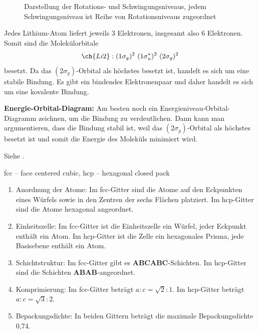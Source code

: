 \begin{figure}[H]
\begin{minipage}[b]{.4\linewidth}
      \caption{Darstellung der Rotations- und Schwingungsniveaus, jedem Schwingungsniveau ist Reihe von Rotationsniveaus zugeordnet}
   \end{minipage}
    \end{figure}


\label{q:44}

Jedes Lithium-Atom liefert jeweils 3 Elektronen, insgesamt also 6 Elektronen. 
Somit sind die Molekülorbitale
\[\ch{Li2} : (1\sigma_g)^2 ~ (1\sigma_u^*)^2 ~ (2\sigma_g)^2\]
besetzt. 
Da das $(2\sigma_g)$-Orbital als höchstes besetzt ist, handelt es sich um eine stabile Bindung. 
Es gibt ein bindendes Elektronenpaar und daher handelt es sich um eine kovalente Bindung.

\textbf{Energie-Orbital-Diagram:} Am besten noch ein Energieniveau-Orbital-Diagramm zeichnen, um die Bindung zu verdeutlichen. Dann kann man argumentieren, dass die Bindung stabil ist, weil das $(2\sigma_g)$-Orbital als höchstes besetzt ist und somit die Energie des Moleküls minimiert wird.

\label{q:45}

Siehe .

\label{q:46}

fcc -- face centered cubic, hcp -- hexagonal closed pack

\begin{enumerate}
    \item Anordnung der Atome: Im fcc-Gitter sind die Atome auf den Eckpunkten eines Würfels sowie in den Zentren der sechs Flächen platziert. Im hcp-Gitter sind die Atome hexagonal angeordnet.
    \item Einheitszelle: Im fcc-Gitter ist die Einheitszelle ein Würfel, jeder Eckpunkt enthält ein Atom. Im hcp-Gitter ist die Zelle ein hexagonales Prisma, jede Basisebene enthält ein Atom.
    \item Schichtstruktur: Im fcc-Gitter gibt es \textbf{ABCABC}-Schichten. Im hcp-Gitter sind die Schichten \textbf{ABAB}-angeordnet.
    \item Komprimierung: Im fcc-Gitter beträgt $a:c = \sqrt{2}:1$. Im hcp-Gitter beträgt $a:c = \sqrt{3}:2$.
    \item Bepackungsdichte: In beiden Gittern beträgt die maximale Bepackungsdichte 0,74.
\end{enumerate}

